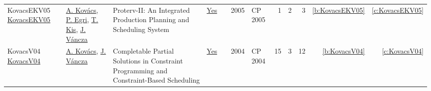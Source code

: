 {\begin{longtable}{>{\raggedright\arraybackslash}p{3cm}>{\raggedright\arraybackslash}p{6cm}>{\raggedright\arraybackslash}p{6.5cm}rrrp{2.5cm}rrrrr}
KovacsEKV05 \href{https://doi.org/10.1007/11564751\_118}{KovacsEKV05} & \hyperref[auth:a147]{A. Kov{\'{a}}cs}, \hyperref[auth:a280]{P. Egri}, \hyperref[auth:a157]{T. Kis}, \hyperref[auth:a281]{J. V{\'{a}}ncza} & Proterv-II: An Integrated Production Planning and Scheduling System & \href{works/KovacsEKV05.pdf}{Yes} & \cite{KovacsEKV05} & 2005 & CP 2005 & 1 & 2 & 3 & \ref{b:KovacsEKV05} & \ref{c:KovacsEKV05}\\
KovacsV04 \href{https://doi.org/10.1007/978-3-540-30201-8\_26}{KovacsV04} & \hyperref[auth:a147]{A. Kov{\'{a}}cs}, \hyperref[auth:a281]{J. V{\'{a}}ncza} & Completable Partial Solutions in Constraint Programming and Constraint-Based Scheduling & \href{works/KovacsV04.pdf}{Yes} & \cite{KovacsV04} & 2004 & CP 2004 & 15 & 3 & 12 & \ref{b:KovacsV04} & \ref{c:KovacsV04}\\
\end{longtable}
}

